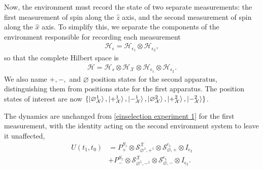 Now, the environment must record the state of two separate measurements: the first measurement of spin along the $\hat{z}$ axis, and the second measurement of spin along the $\hat{x}$ axis. To simplify this, we separate the components of the environment responsible for recording each measurement
\begin{align}
  \mathcal{H}_\epsilon = \mathcal{H}_{\epsilon_1} \otimes \mathcal{H}_{\epsilon_2},
\end{align}
so that the complete Hilbert space is
\begin{align}
  \mathcal{H} = \mathcal{H}_s \otimes \mathcal{H}_\mathcal{X} \otimes \mathcal{H}_{\epsilon_1} \otimes \mathcal{H}_{\epsilon_2}.
\end{align}
We also name $+, -,$ and $\varnothing$ position states for the second apparatus, distinguishing them from positions state for the first apparatus. The position states of interest are now $\{ \ket{\varnothing_{\mathcal{X}}^1}, \ket{+_{\mathcal{X}}^1}, \ket{-_{\mathcal{X}}^1}, \ket{\varnothing_{\mathcal{X}}^2}, \ket{+_{\mathcal{X}}^2}, \ket{-_{\mathcal{X}}^2} \}$.

The dynamics are unchanged from \autoref{einselection experiment 1} for the first measurement, with the identity acting on the second environment system to leave it unaffected,
\begin{align}
  U(t_1, t_0) &= P^{S_z}_+ \otimes \mathcal{S}^{\mathcal{X}}_{\varnothing^1, +^1}  \nonumber \otimes \mathcal{S}^{\epsilon_1}_{ \varnothing, +} \otimes I_{\epsilon_2}\\ \nonumber
  &+ P^{S_z}_- \otimes \mathcal{S}^{\mathcal{X}}_{\varnothing^1, -^1} \otimes \mathcal{S}^{\epsilon_1}_{\varnothing, -} \otimes I_{\epsilon_2}.
\end{align}

